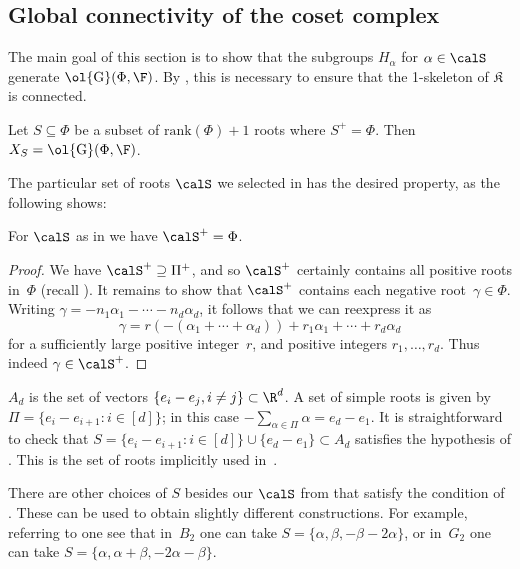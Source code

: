 \documentclass[11pt]{article}
\newcommand{\Esc}[2]{\ol{\mathrm{G}}(#1,#2)}
\newcommand{\Gu}[2]{\ol{\mathrm{G}}(#1,#2)}
\newcommand{\rank}{{\mathrm{rank}}}
\newcommand{\complex}{\mathfrak{K}}
\begin{document}
\subsection{Global connectivity of the coset complex}

The main goal of this section is to show that the subgroups $H_\alpha$ for $\alpha \in \calS$ generate $\Esc{\Phi}{\F}$. By , this is necessary to ensure that the 1-skeleton of $\complex$ is connected.

\begin{theorem}\label{thm:rootgen}
    Let $S \subseteq \Phi$ be a subset of $\rank(\Phi)+1$ roots where $S^+ = \Phi$. Then $X_S = \Gu{\Phi}{\F}$.
\end{theorem}

The particular set of roots $\calS$ we selected in  has the desired property, as the following shows:
\begin{proposition}\label{prop:sspan}
    For $\calS$ as in \textnormal{} we have $\calS^+ = \Phi$.
\end{proposition}
\begin{proof}
    We  have $\calS^+ \supseteq \Pi^+$, and so $\calS^+$ certainly contains all positive roots in~$\Phi$ (recall ).
    It remains to show that $\calS^+$ contains each negative root~$\gamma \in \Phi$.
    Writing $\gamma = -n_1 \alpha_1 - \cdots -n_d \alpha_d$, it follows that we can reexpress it as
    \[
        \gamma = r (-(\alpha_1 + \cdots + \alpha_d)) + r_1 \alpha_1 + \cdots + r_d \alpha_d
    \]
    for a sufficiently large positive integer~$r$, and positive integers $r_1, \dots, r_d$.
    Thus indeed $\gamma \in \calS^+$.
\end{proof}
\begin{example}
    $A_d$ is the set of vectors $\{e_i -e_j, i \neq j\} \subset \R^d$. A set of simple roots is given by $ \Pi = \{e_i-e_{i+1} : i \in [d]\}$; in this case $-\sum_{\alpha \in \Pi} \alpha = e_d-e_1$. It is straightforward to check that $S = \{e_i-e_{i+1} : i \in [d]\}\cup \{e_d-e_1\} \subset A_d$ satisfies the hypothesis of . This is the set of roots implicitly used in~\cite{KO18}.
\end{example}
\begin{remark}  \label{rem:alt}
    There are other choices of $S$ besides our $\calS$ from  that satisfy the condition of .
    These can be used to obtain slightly different constructions.
    For example, referring to  one see that in~$B_2$ one can take $S = \{\alpha, \beta, -\beta-2\alpha\}$, or in~$G_2$ one can take $S = \{\alpha, \alpha+\beta, -2\alpha - \beta\}$.
\end{remark}
\end{document}
